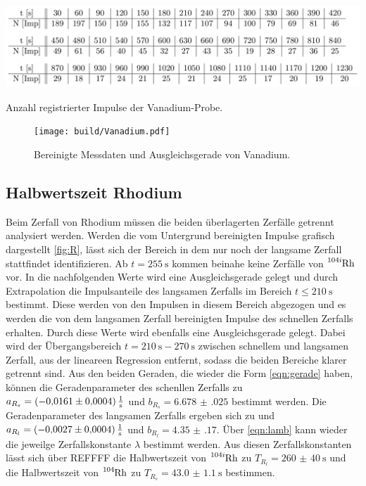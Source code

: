 \begin{table}
\centering
\includegraphics[width=\textwidth]{data/Vanadium.png}
\caption{Anzahl registrierter Impulse der Vanadium-Probe.}
\label{tab:V}
\end{table}

\begin{figure}
\centering
\texttt{[image: build/Vanadium.pdf]}
\caption{Bereinigte Messdaten und Ausgleichsgerade von Vanadium.}
\label{fig:V}
\end{figure}

\subsection{Halbwertszeit Rhodium}
Beim Zerfall von Rhodium müssen die beiden überlagerten Zerfälle getrennt analysiert werden. Werden die vom Untergrund bereinigten Impulse grafisch dargestellt \ref{fig:R}, lässt sich der Bereich in dem nur noch der langsame Zerfall stattfindet identifizieren. Ab $t=\SI{255}{\s}$ kommen beinahe keine Zerfälle von $\ce{^{104i}Rh}$ vor. In die nachfolgenden Werte wird eine Ausgleichsgerade gelegt und durch Extrapolation die Impulsanteile des langsamen Zerfalls im Bereich $t\leq\SI{210}{\s}$ bestimmt. Diese werden von den Impulsen in diesem Bereich abgezogen und es werden die von dem langsamen Zerfall bereinigten Impulse des schnellen Zerfalls erhalten. Durch diese Werte wird ebenfalls eine Ausgleichsgerade gelegt. Dabei wird der Übergangsbereich $t=\SI{210}{\s}-\SI{270}{\s}$ zwischen schnellem und langsamen Zerfall, aus der lineareen Regression entfernt, sodass die beiden Bereiche klarer getrennt sind. Aus den beiden Geraden, die wieder die Form \eqref{eqn:gerade} haben, können die Geradenparameter des schenllen Zerfalls zu $a_{R_s}=\SI{-0.0161(0004)}{\frac{1}{\s}}$ und $b_{R_s}=\num{6.678(025)}$ bestimmt werden. Die Geradenparameter des langsamen Zerfalls ergeben sich zu und $a_{R_l}=\SI{-0.0027(0004)}{\frac{1}{\s}}$ und $b_{R_l}=\num{4.35(17)}$. Über \eqref{eqn:lamb} kann wieder die jeweilge Zerfallskonstante $\lambda$ bestimmt werden. Aus diesen Zerfallskonstanten lässt sich über REFFFF die Halbwertszeit von $\ce{^{104i}Rh}$ zu $T_{R_l}=\SI{260(40)}{\s}$ und die Halbwertszeit von $\ce{^{104}Rh}$ zu $T_{R_s}=\SI{43.0(11)}{\s}$ bestimmen.



